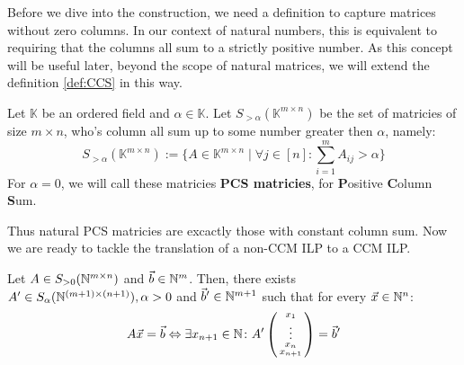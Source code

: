 Before we dive into the construction, we need a definition to capture matrices without zero columns. In our context of natural numbers, this is equivalent to requiring that the columns all sum to a strictly positive number. As this concept will be useful later, beyond the scope of natural matrices, we will extend the definition \ref{def:CCS} in this way.

\begin{definition}
    \label{def:PCS}
    Let $\mathbb{K}$ be an ordered field and $\alpha \in \mathbb{K}$. Let $S_{>\alpha}(\mathbb{K}^{m \times n})$ be the set of matricies of size $m \times n$, who's column all sum up to some number greater then $\alpha$, namely:
    $$S_{>\alpha}(\mathbb{K}^{m \times n}) := \{A \in \mathbb{K}^{m \times n}\mid \forall j \in [n]\colon \sum_{i=1}^{m} A_{ij} > \alpha\}$$
    For $\alpha = 0$, we will call these matricies \textbf{PCS matricies}, for \textbf{P}ositive \textbf{C}olumn \textbf{S}um.
\end{definition}

Thus natural PCS matricies are excactly those with constant column sum. Now we are ready to tackle the translation of a non-CCM ILP to a CCM ILP.

\begin{theorem}
    \label{theorem:column_sum_construction}
    Let $A\in S_{>0}(\mathbb{N}^{m \times n})$ and $\vec b \in \mathbb{N}^m$. Then, there exists $A' \in S_\alpha(\mathbb{N}^{(m+1) \times (n+1)}), \alpha > 0$ and $\vec b' \in \mathbb{N}^{m+1}$ such that for every $\vec x \in \mathbb{N}^n$:
    $$A\vec x = \vec b \Leftrightarrow \exists x_{n+1}\in \mathbb{N}\colon A' \left(\begin{smallmatrix}
        x_1\\
        \vdots\\
        x_n\\
        x_{n+1}
    \end{smallmatrix}\right) = \vec b'$$
\end{theorem}

